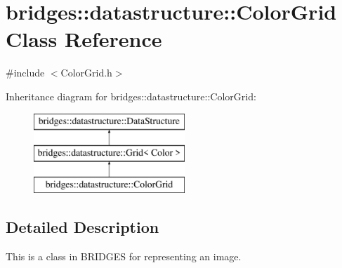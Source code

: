 \hypertarget{classbridges_1_1datastructure_1_1_color_grid}{}\section{bridges\+:\+:datastructure\+:\+:Color\+Grid Class Reference}
\label{classbridges_1_1datastructure_1_1_color_grid}


{\ttfamily \#include $<$Color\+Grid.\+h$>$}

Inheritance diagram for bridges\+:\+:datastructure\+:\+:Color\+Grid\+:\begin{figure}[H]
\begin{center}
\leavevmode
\includegraphics[height=3.000000cm]{classbridges_1_1datastructure_1_1_color_grid}
\end{center}
\end{figure}


\subsection{Detailed Description}
This is a class in B\+R\+I\+D\+G\+ES for representing an image. 

